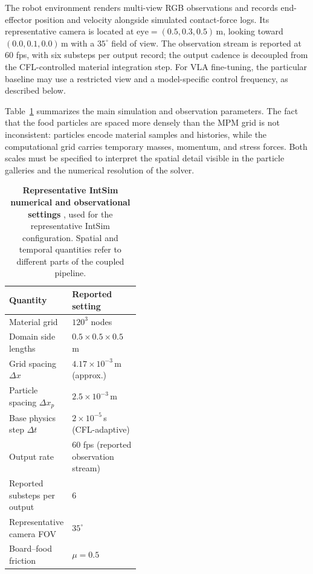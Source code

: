 The robot environment renders multi-view RGB observations and records end-effector position and velocity alongside simulated contact-force logs. Its representative camera is located at $\mathrm{eye}=(0.5,0.3,0.5)$\,m, looking toward $(0.0,0.1,0.0)$\,m with a $35^{\circ}$ field of view. The observation stream is reported at 60 fps, with six substeps per output record; the output cadence is decoupled from the CFL-controlled material integration step. For VLA fine-tuning, the particular baseline may use a restricted view and a model-specific control frequency, as described below.

Table~\ref{tab:cut_discretization} summarizes the main simulation and observation parameters. The fact that the food particles are spaced more densely than the MPM grid is not inconsistent: particles encode material samples and histories, while the computational grid carries temporary masses, momentum, and stress forces. Both scales must be specified to interpret the spatial detail visible in the particle galleries and the numerical resolution of the solver.

\begin{table}[!htbp]
  \centering
  \caption[{Representative IntSim numerical and observational settings}]{\textbf{Representative IntSim numerical and observational settings} , used for the representative IntSim configuration. Spatial and temporal quantities refer to different parts of the coupled pipeline.}
  \label{tab:cut_discretization}
  \begingroup
  \CutTableSetup
  \begin{tabularx}{\linewidth}{@{}>{\raggedright\arraybackslash}p{0.43\linewidth}X@{}}
    \toprule
    Quantity & Reported setting \\
    \midrule
    Material grid & $120^3$ nodes \\
    Domain side lengths & $0.5\times0.5\times0.5$\,m \\
    Grid spacing $\Delta x$ & $4.17\times10^{-3}$\,m (approx.) \\
    Particle spacing $\Delta x_p$ & $2.5\times10^{-3}$\,m \\
    Base physics step $\Delta t$ & $2\times10^{-5}$\,s (CFL-adaptive) \\
    Output rate & 60 fps (reported observation stream) \\
    Reported substeps per output & 6 \\
    Representative camera FOV & $35^{\circ}$ \\
    Board--food friction & $\mu=0.5$ \\
    \bottomrule
  \end{tabularx}
  \endgroup
\end{table}

